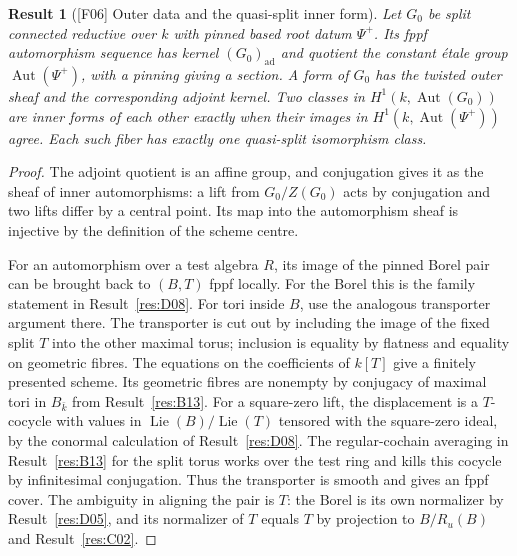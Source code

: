 \documentclass[11pt,a4paper,openany,oneside]{book}
\theoremstyle{resultstyle}
\newtheorem{statement}{Result}[chapter]
\newenvironment{result}[2]{\clubpenalty=10000\begin{statement}[\textnormal{[#1]} #2]\leavevmode\label{res:#1}\ignorespaces}{\end{statement}}
\theoremstyle{definition}
\numberwithin{equation}{chapter}
\DeclareMathOperator{\Lie}{Lie}
\DeclareMathOperator{\Aut}{Aut}
\begin{document}
\begin{result}{F06}{Outer data and the quasi-split inner form}
Let $G_0$ be split connected reductive over $k$ with pinned based root datum $\Psi^+$. Its fppf automorphism sequence has kernel $(G_0)_{\mathrm{ad}}$ and quotient the constant étale group $\Aut(\Psi^+)$, with a pinning giving a section. A form of $G_0$ has the twisted outer sheaf and the corresponding adjoint kernel. Two classes in $H^1(k,\Aut(G_0))$ are inner forms of each other exactly when their images in $H^1(k,\Aut(\Psi^+))$ agree. Each such fiber has exactly one quasi-split isomorphism class.
\end{result}
\begin{proof}
The adjoint quotient is an affine group, and conjugation
gives it as the sheaf of inner automorphisms: a lift from
\(G_0/Z(G_0)\) acts by conjugation and two lifts differ
by a central point. Its map into the automorphism sheaf
is injective by the definition of the scheme centre.

For an automorphism over a test algebra \(R\), its image
of the pinned Borel pair can be brought back to \((B,T)\)
fppf locally. For the Borel this is the family statement in
Result~\ref{res:D08}. For tori inside \(B\), use the analogous
transporter argument there. The transporter is cut out by
including the image of the fixed split \(T\) into the other
maximal torus; inclusion is equality by flatness and equality
on geometric fibres. The equations on the coefficients of
\(k[T]\) give a finitely presented scheme. Its geometric
fibres are nonempty by conjugacy of maximal tori in
\(B_{\bar k}\) from Result~\ref{res:B13}.
For a square-zero lift, the displacement is a \(T\)-cocycle
with values in \(\Lie(B)/\Lie(T)\) tensored with the
square-zero ideal, by the conormal calculation of
Result~\ref{res:D08}. The regular-cochain averaging in
Result~\ref{res:B13} for the split torus works over the
test ring and kills this cocycle by infinitesimal conjugation.
Thus the transporter is smooth and gives an fppf cover.
The ambiguity in aligning the pair is \(T\):
the Borel is its own normalizer by Result~\ref{res:D05},
and its normalizer of \(T\) equals \(T\) by projection to
\(B/R_u(B)\) and Result~\ref{res:C02}.


\end{proof}
\end{document}
